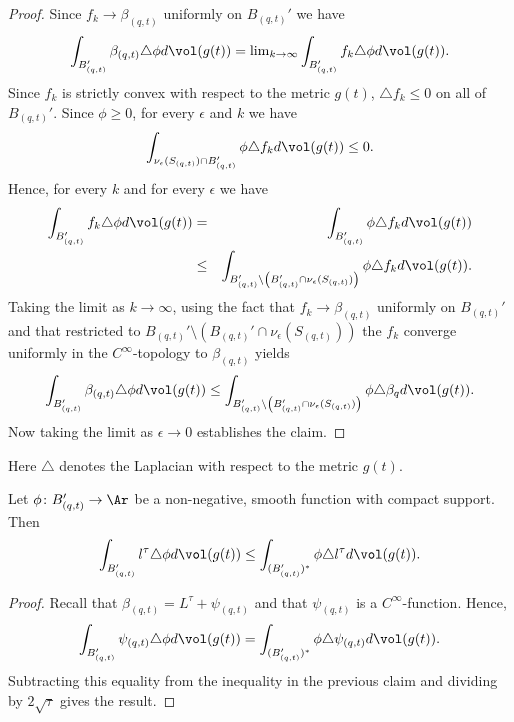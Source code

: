 \begin{proof}\sketch
{}
Since $f_k\rightarrow \beta_{(q,t)}$ uniformly on $B_{(q,t)}'$ we
have
$$\int_{B_{(q,t)}'}\beta_{(q,t)}\triangle \phi d\vol(g(t))=\mathrm{lim}_{k\rightarrow
\infty}\int_{B_{(q,t)}'}f_k\triangle \phi  d\vol(g(t)).$$ Since
$f_k$ is strictly convex with respect to the metric $g(t)$,
$\triangle f_k\le 0$ on all of $B_{(q,t)}'$. Since $\phi\ge 0$, for
every $\epsilon$ and $k$ we have
$$\int_{\nu_\epsilon(S_{(q,t)})\cap B_{(q,t)}'}\phi\triangle f_k  d\vol(g(t))\le
0.$$ Hence, for every $k$ and for every $\epsilon$ we have
\begin{eqnarray*}
\int_{B_{(q,t)}'}f_k\triangle \phi d\vol(g(t)) & = &
\int_{B_{(q,t)}'}\phi\triangle f_k  d\vol(g(t)) \\
& \le & \int_{B_{(q,t)}'\setminus \left(B_{(q,t)}'\cap
\nu_\epsilon(S_{(q,t)})\right)}\phi\triangle f_k d\vol(g(t)).\end{eqnarray*}
 Taking the limit as $k\rightarrow\infty$,
using the fact that $f_k\rightarrow \beta_{(q,t)}$ uniformly on
$B_{(q,t)}'$ and that restricted to
$B_{(q,t)}'\setminus(B_{(q,t)}'\cap \nu_\epsilon (S_{(q,t)}))$ the
$f_k$ converge uniformly in the $C^\infty$-topology to
$\beta_{(q,t)}$ yields
$$\int_{B_{(q,t)}'}\beta_{(q,t)}\triangle \phi d\vol(g(t))
\le \int_{B_{(q,t)}'\setminus \left(B_{(q,t)}'\cap
\nu_\epsilon(S_{(q,t)})\right)}\phi\triangle \beta_q d\vol(g(t)).$$ Now taking the limit as $\epsilon\rightarrow 0$
establishes the claim.
\end{proof}


\begin{remark}
\label{rem:laplacian-convention-metric-gt}
Here $\triangle$ denotes the Laplacian with respect to the metric
$g(t)$.
\end{remark}

\begin{corollary}
\label{cor:l-tau-weak-laplacian-inequality}
\label{ltauineq}
Let $\phi\colon B_{(q,t)}'\to \Ar$ be a non-negative, smooth
function with compact support. Then
$$\int_{B_{(q,t)}'}l^\tau\triangle \phi d\vol(g(t))\le \int_{(B_{(q,t)}')^*}\phi
\triangle l^\tau d\vol(g(t)).$$
\end{corollary}


\begin{proof}\sketch
{}
Recall that $\beta_{(q,t)}=L^\tau+\psi_{(q,t)}$ and that
$\psi_{(q,t)}$ is a $C^\infty$-function. Hence,
$$\int_{B_{(q,t)}'}\psi_{(q,t)}\triangle \phi d\vol(g(t))= \int_{(B_{(q,t)}')^*}\phi
\triangle \psi_{(q,t)} d\vol(g(t)).$$ Subtracting this equality
from the inequality in the previous claim and dividing by
$2\sqrt{\tau}$ gives the result.
\end{proof}


